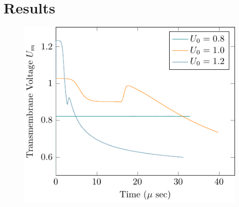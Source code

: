 \documentclass[english,12pt]{article}
\begin{document}
\section{Results}
\begin{figure}[H]
\centering
\includegraphics[scale=1.0]{pics/Vm.pdf}
\end{figure}
\end{document}
